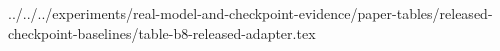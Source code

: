 ../../../experiments/real-model-and-checkpoint-evidence/paper-tables/released-checkpoint-baselines/table-b8-released-adapter.tex